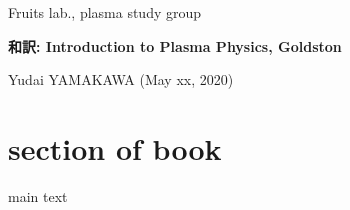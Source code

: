 \documentclass[a4j,10pt,dvipdfmx]{jsarticle}
\begin{document}
%
%
%
\noindent
{\footnotesize
Fruits lab., plasma study group    %
}

\noindent
	\textbf{\Large
		和訳: Introduction to Plasma Physics, Goldston    %
	}

	\vspace{1ex}

\noindent
	\textrm{\small 
		Yudai YAMAKAWA (May xx, 2020)    %
	}



\vspace{4ex}


\section{section of book}
%
main text
%
\end{document}
